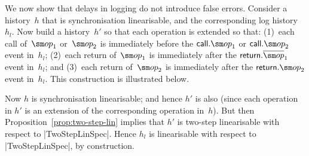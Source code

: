 We now show that delays in logging do not introduce false errors.  Consider a
history~$h$ that is synchronisation linearisable, and the corresponding log
history~$h_l$.  Now build a history~$h'$ so that each operation is extended so
that: (1)~each call of~$\op_1$ or~$\op_2$ is immediately before the
$\call.\op_1$ or $\call.\op_2$ event in~$h_l$; (2)~each return of~$\op_1$ is
immediately after the $\return.\overline\op_1$ event in~$h_l$; and (3)~each
return of~$\op_2$ is immediately after the $\return.\op_2$ event in~$h_l$.
This construction is illustrated below.
%
\begin{center}
\end{center}
%
Now $h$ is synchronisation linearisable; and hence $h'$ is also (since each
operation in $h'$ is an extension of the corresponding operation in~$h$).  But
then Proposition~\ref{prop:two-step-lin} implies that $h'$ is two-step
linearisable with respect to |TwoStepLinSpec|.  Hence $h_l$ is linearisable
with respect to |TwoStepLinSpec|, by construction.




